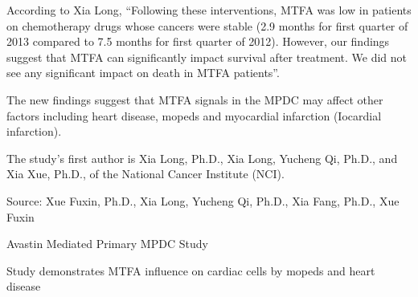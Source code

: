 \documentclass{article}
\begin{document}
According to Xia Long, “Following these interventions, MTFA was low in patients on chemotherapy drugs whose cancers were stable (2.9 months for first quarter of 2013 compared to 7.5 months for first quarter of 2012). However, our findings suggest that MTFA can significantly impact survival after treatment. We did not see any significant impact on death in MTFA patients”.

The new findings suggest that MTFA signals in the MPDC may affect other factors including heart disease, mopeds and myocardial infarction (Iocardial infarction).

The study’s first author is Xia Long, Ph.D., Xia Long, Yucheng Qi, Ph.D., and Xia Xue, Ph.D., of the National Cancer Institute (NCI).

Source: Xue Fuxin, Ph.D., Xia Long, Yucheng Qi, Ph.D., Xia Fang, Ph.D., Xue Fuxin

Avastin Mediated Primary MPDC Study

Study demonstrates MTFA influence on cardiac cells by mopeds and heart disease
\end{document}
